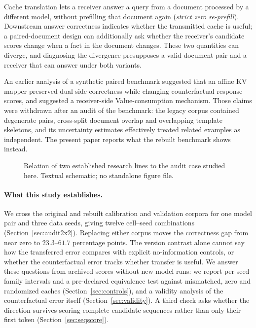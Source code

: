 \documentclass[11pt,a4paper]{article}
\begin{document}
Cache translation lets a receiver answer a query from a document processed by a
different model, without prefilling that document again (\emph{strict zero
re-prefill}). Downstream answer correctness indicates whether the transmitted
cache is useful; a paired-document design can additionally ask whether the
receiver's candidate scores change when a fact in the document changes. These
two quantities can diverge, and diagnosing the divergence presupposes a valid
document pair and a receiver that can answer under both variants.

An earlier analysis of a synthetic paired benchmark suggested that an affine
KV mapper preserved dual-side correctness while changing counterfactual
response scores, and suggested a receiver-side Value-consumption mechanism.
Those claims were withdrawn after an audit of the benchmark: the legacy corpus
contained degenerate pairs, cross-split document overlap and overlapping
template skeletons, and its uncertainty estimates effectively treated related
examples as independent. The present paper reports what the rebuilt benchmark
shows instead.

\begin{figure}[t]
\centering
{}
\caption{Relation of two established research lines to the audit case studied
here. Textual schematic; no standalone figure file.}
\label{fig:f1}
\end{figure}

\paragraph{What this study establishes.}

We cross the original and rebuilt calibration and validation corpora for one
model pair and three data seeds, giving twelve cell--seed combinations
(Section~\ref{sec:audit2x2}). Replacing either corpus moves the correctness gap
from near zero to $23.3$--$61.7$ percentage points. The version contrast alone
cannot say how the transferred error compares with explicit no-information
controls, or whether the counterfactual error tracks whether transfer is
useful. We answer these questions from archived scores without new model runs:
we report per-seed family intervals and a pre-declared equivalence test against
mismatched, zero and randomized caches (Section~\ref{sec:controls}), and a
validity analysis of the counterfactual error itself
(Section~\ref{sec:validity}). A third check asks whether the direction survives
scoring complete candidate sequences rather than only their first token
(Section~\ref{sec:seqscore}).
\end{document}
